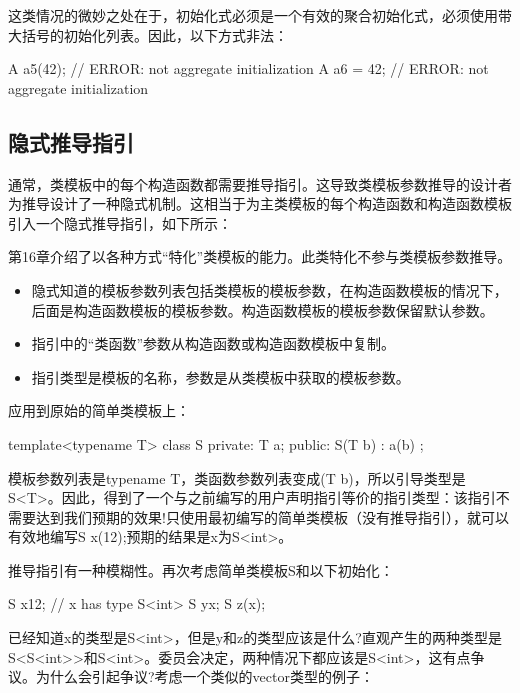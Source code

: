 这类情况的微妙之处在于，初始化式必须是一个有效的聚合初始化式，必须使用带大括号的初始化列表。因此，以下方式非法：

\begin{cpp}
A a5(42); // ERROR: not aggregate initialization
A a6 = 42; // ERROR: not aggregate initialization
\end{cpp}

\subsection{隐式推导指引}

通常，类模板中的每个构造函数都需要推导指引。这导致类模板参数推导的设计者为推导设计了一种隐式机制。这相当于为主类模板的每个构造函数和构造函数模板引入一个隐式推导指引，如下所示：

\begin{notice}
第16章介绍了以各种方式“特化”类模板的能力。此类特化不参与类模板参数推导。
\end{notice}

\begin{itemize}
\item 
隐式知道的模板参数列表包括类模板的模板参数，在构造函数模板的情况下，后面是构造函数模板的模板参数。构造函数模板的模板参数保留默认参数。

\item 
指引中的“类函数”参数从构造函数或构造函数模板中复制。

\item 
指引类型是模板的名称，参数是从类模板中获取的模板参数。
\end{itemize}	

应用到原始的简单类模板上：

\begin{cpp}
template<typename T>
class S {
	private:
	T a;
	public:
	S(T b) : a(b) {
	}
};
\end{cpp}

模板参数列表是typename T，类函数参数列表变成(T b)，所以引导类型是S<T>。因此，得到了一个与之前编写的用户声明指引等价的指引类型：该指引不需要达到我们预期的效果!只使用最初编写的简单类模板（没有推导指引），就可以有效地编写S x(12);预期的结果是x为S<int>。

推导指引有一种模糊性。再次考虑简单类模板S和以下初始化：

\begin{cpp}
S x{12}; // x has type S<int>
S y{x};
S z(x);
\end{cpp}

已经知道x的类型是S<int>，但是y和z的类型应该是什么?直观产生的两种类型是S<S<int>{}>和S<int>。委员会决定，两种情况下都应该是S<int>，这有点争议。为什么会引起争议?考虑一个类似的vector类型的例子：

